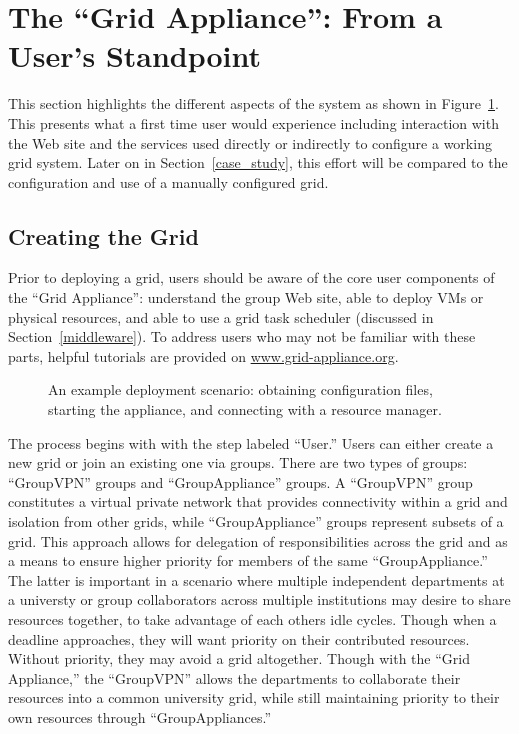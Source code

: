 \documentclass[conference]{IEEEtran}
\begin{document}
\section{The ``Grid Appliance'': From a User's Standpoint}
\label{system}

This section highlights the different aspects of the system as shown in
Figure~\ref{fig:system}.  This presents what a first time user would experience
including interaction with the Web site and the services used directly or
indirectly to configure a working grid system.  Later on in
Section~\ref{case_study}, this effort will be compared to the configuration and
use of a manually configured grid.

\subsection{Creating the Grid}

Prior to deploying a grid, users should be aware of the core user components of
the ``Grid Appliance'': understand the group Web site, able to deploy VMs or
physical resources, and able to use a grid task scheduler (discussed in
Section~\ref{middleware}).  To address users who may not be familiar with these
parts, helpful tutorials are provided on \url{www.grid-appliance.org}.  

\begin{figure}[ht]
\centering
{}
\caption{An example deployment scenario:  obtaining configuration files,
starting the appliance, and connecting with a resource manager.}
\label{fig:system}
\end{figure}

The process begins with with the step labeled ``User.'' Users can either create
a new grid or join an existing one via groups.  There are two types of groups:
``GroupVPN'' groups and ``GroupAppliance'' groups. A ``GroupVPN'' group
constitutes a virtual private network that provides connectivity within a grid
and isolation from other grids, while ``GroupAppliance'' groups represent
subsets of a grid.  This approach allows for delegation of responsibilities
across the grid and as a means to ensure higher priority for members of the
same ``GroupAppliance.'' The latter is important in a scenario where multiple
independent departments at a universty or group collaborators across multiple
institutions may desire to share resources together, to take advantage of each
others idle cycles.  Though when a deadline approaches, they will want priority
on their contributed resources.  Without priority, they may avoid a grid
altogether.  Though with the ``Grid Appliance,'' the ``GroupVPN'' allows the
departments to collaborate their resources into a common university grid, while
still maintaining priority to their own resources through ``GroupAppliances.''
\end{document}
